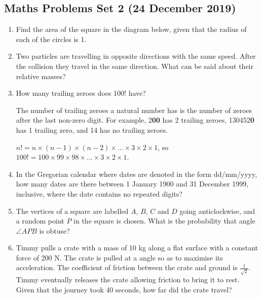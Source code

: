 \documentclass{article}
\begin{document}
\begin{center}
    \section*{Maths Problems Set 2 (24 December 2019)}
\end{center}

\begin{enumerate}
    \item
    Find the area of the square in the diagram below, given that the radius of each of the circles is 1.
    

    \item
    Two particles are travelling in opposite directions with the same speed. After the collision they travel in the same direction. What can be said about their relative masses?
    
    \item
    How many trailing zeroes does 100! have?
    
    The number of trailing zeroes a natural number has is the number of zeroes after the last non-zero digit. For example, 2\textbf{00} has 2 trailing zeroes, 130452\textbf{0} has 1 trailing zero, and 14 has no trailing zeroes.
    
    $n! = n \times (n - 1) \times (n - 2) \times ... \times 3 \times 2 \times 1$, so $100! = 100 \times 99 \times 98 \times ... \times 3 \times 2 \times 1$.
    
    \item
    In the Gregorian calendar where dates are denoted in the form dd/mm/yyyy, how many dates are there between 1 January 1900 and 31 December 1999, inclusive, where the date contains no repeated digits?
    
    \item
    The vertices of a square are labelled $A$, $B$, $C$ and $D$ going anticlockwise, and a random point $P$ in the square is chosen. What is the probability that angle $\angle{APB}$ is obtuse?
    
    \item
    Timmy pulls a crate with a mass of 10 kg along a flat surface with a constant force of 200 N. The crate is pulled at a angle so as to maximise its acceleration. The coefficient of friction between the crate and ground is $\frac{1}{\sqrt{2}}$. Timmy eventually releases the crate allowing friction to bring it to rest. Given that the journey took 40 seconds, how far did the crate travel?
    

\end{enumerate}
\end{document}
